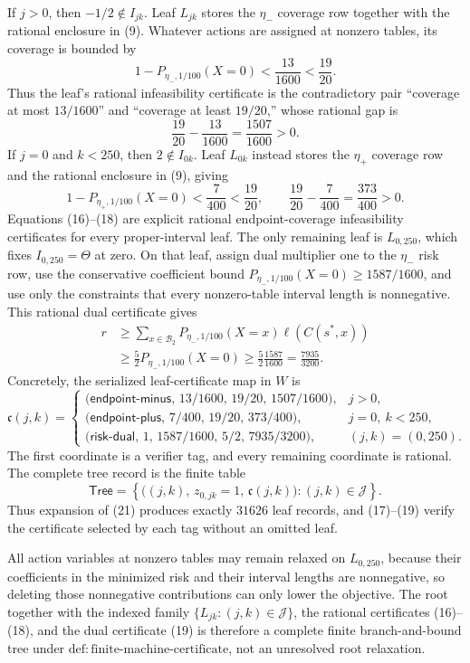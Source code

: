 If \(j>0\), then \(-1/2\notin I_{jk}\). Leaf \(L_{jk}\) stores the \(\eta_-\) coverage row together with the rational enclosure in (9). Whatever actions are assigned at nonzero tables, its coverage is bounded by
\[
 1-P_{\eta_-,1/100}(X=0)<\frac{13}{1600}<\frac{19}{20}.
\tag{16}
\]
Thus the leaf's rational infeasibility certificate is the contradictory pair ``coverage at most \(13/1600\)'' and ``coverage at least \(19/20\),'' whose rational gap is
\[
 \frac{19}{20}-\frac{13}{1600}=\frac{1507}{1600}>0.
\tag{17}
\]
If \(j=0\) and \(k<250\), then \(2\notin I_{0k}\). Leaf \(L_{0k}\) instead stores the \(\eta_+\) coverage row and the rational enclosure in (9), giving
\[
 1-P_{\eta_+,1/100}(X=0)<\frac7{400}<\frac{19}{20},
 \qquad
 \frac{19}{20}-\frac7{400}=\frac{373}{400}>0.
\tag{18}
\]
Equations (16)--(18) are explicit rational endpoint-coverage infeasibility certificates for every proper-interval leaf. The only remaining leaf is \(L_{0,250}\), which fixes \(I_{0,250}=\Theta\) at zero. On that leaf, assign dual multiplier one to the \(\eta_-\) risk row, use the conservative coefficient bound \(P_{\eta_-,1/100}(X=0)\ge1587/1600\), and use only the constraints that every nonzero-table interval length is nonnegative. This rational dual certificate gives
\[
 \begin{aligned}
 r
 &\ge \sum_{x\in\mathcal B_2}
 P_{\eta_-,1/100}(X=x)\ell(C(s^*,x))\\
 &\ge \frac52 P_{\eta_-,1/100}(X=0)
 \ge\frac52\frac{1587}{1600}
 =\frac{7935}{3200}.
\end{aligned}
\tag{19}
\]
Concretely, the serialized leaf-certificate map in \(W\) is
\[
 \mathfrak c(j,k)=
 \begin{cases}
 \bigl(\mathsf{endpoint\text{-}minus},\,13/1600,\,19/20,\,1507/1600\bigr),
   &j>0,\\
 \bigl(\mathsf{endpoint\text{-}plus},\,7/400,\,19/20,\,373/400\bigr),
   &j=0,\ k<250,\\
 \bigl(\mathsf{risk\text{-}dual},\,1,\,1587/1600,\,5/2,\,7935/3200\bigr),
   &(j,k)=(0,250).
 \end{cases}
\tag{20}
\]
The first coordinate is a verifier tag, and every remaining coordinate is rational. The complete tree record is the finite table
\[
 \mathsf{Tree}
 =\left\{\bigl((j,k),\,z_{0,jk}=1,\,\mathfrak c(j,k)\bigr):
 (j,k)\in\mathscr J\right\}.
\tag{21}
\]
Thus expansion of (21) produces exactly \(31626\) leaf records, and (17)--(19) verify the certificate selected by each tag without an omitted leaf.

All action variables at nonzero tables may remain relaxed on \(L_{0,250}\), because their coefficients in the minimized risk and their interval lengths are nonnegative, so deleting those nonnegative contributions can only lower the objective. The root together with the indexed family \(\{L_{jk}:(j,k)\in\mathscr J\}\), the rational certificates (16)--(18), and the dual certificate (19) is therefore a complete finite branch-and-bound tree under \(\mathrm{def{:}finite\text{-}machine\text{-}certificate}\), not an unresolved root relaxation.

